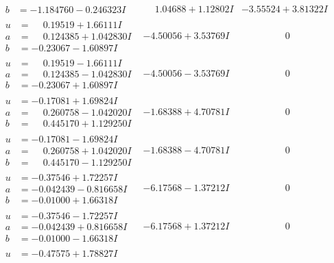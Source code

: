 \documentclass[1p]{elsarticle_modified}
\theoremstyle{definition}
\begin{document}
$$\begin{array}{c|c|c}
\begin{aligned}
b &= -1.184760 - 0.246323 I\end{aligned}
 & \phantom{-}1.04688 + 1.12802 I & -3.55524 + 3.81322 I \\ \hline\begin{aligned}
u &= \phantom{-}0.19519 + 1.66111 I \\
a &= \phantom{-}0.124385 + 1.042830 I \\
b &= -0.23067 - 1.60897 I\end{aligned}
 & -4.50056 + 3.53769 I & \phantom{-0.000000 } 0 \\ \hline\begin{aligned}
u &= \phantom{-}0.19519 - 1.66111 I \\
a &= \phantom{-}0.124385 - 1.042830 I \\
b &= -0.23067 + 1.60897 I\end{aligned}
 & -4.50056 - 3.53769 I & \phantom{-0.000000 } 0 \\ \hline\begin{aligned}
u &= -0.17081 + 1.69824 I \\
a &= \phantom{-}0.260758 - 1.042020 I \\
b &= \phantom{-}0.445170 + 1.129250 I\end{aligned}
 & -1.68388 + 4.70781 I & \phantom{-0.000000 } 0 \\ \hline\begin{aligned}
u &= -0.17081 - 1.69824 I \\
a &= \phantom{-}0.260758 + 1.042020 I \\
b &= \phantom{-}0.445170 - 1.129250 I\end{aligned}
 & -1.68388 - 4.70781 I & \phantom{-0.000000 } 0 \\ \hline\begin{aligned}
u &= -0.37546 + 1.72257 I \\
a &= -0.042439 - 0.816658 I \\
b &= -0.01000 + 1.66318 I\end{aligned}
 & -6.17568 - 1.37212 I & \phantom{-0.000000 } 0 \\ \hline\begin{aligned}
u &= -0.37546 - 1.72257 I \\
a &= -0.042439 + 0.816658 I \\
b &= -0.01000 - 1.66318 I\end{aligned}
 & -6.17568 + 1.37212 I & \phantom{-0.000000 } 0 \\ \hline\begin{aligned}
u &= -0.47575 + 1.78827 I \\

\end{aligned}
\end{array}$$
\end{document}
